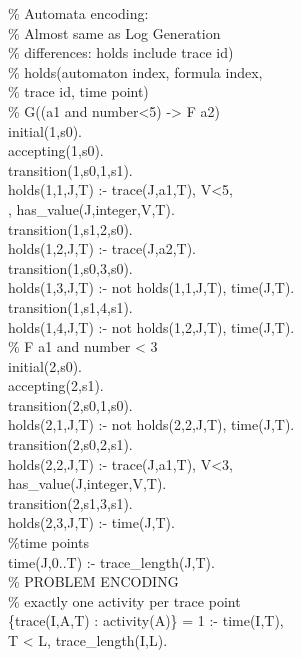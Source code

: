 \begin{small}
\begin{aspcode}
\noindent
\% Automata encoding:\\
\% Almost same as Log Generation\\
\% differences: holds include trace id)\\
\% holds(automaton index, formula index,\\ 
\% \phantom{holds(au} trace id, time point)\\

\noindent
\% G((a1 and number<5) -> F a2)\\
initial(1,s0).\\
accepting(1,s0).\\
transition(1,s0,1,s1).\\
holds(1,1,J,T) :- trace(J,a1,T), V<5,\\ 
\phantom{ho}, has\_value(J,integer,V,T).\\ 
transition(1,s1,2,s0).\\
holds(1,2,J,T) :- trace(J,a2,T).\\
transition(1,s0,3,s0).\\
holds(1,3,J,T) :- not holds(1,1,J,T), time(J,T).\\
transition(1,s1,4,s1).\\
holds(1,4,J,T) :- not holds(1,2,J,T), time(J,T).\\

\noindent 
\% F a1 and number < 3\\
initial(2,s0).\\
accepting(2,s1).\\
transition(2,s0,1,s0).\\
holds(2,1,J,T) :- not holds(2,2,J,T), time(J,T).\\ 
transition(2,s0,2,s1).\\
holds(2,2,J,T) :- trace(J,a1,T), V<3,\\ 
\phantom{ho}has\_value(J,integer,V,T).\\
transition(2,s1,3,s1).\\
holds(2,3,J,T) :- time(J,T).\\

\noindent
\%time points\\
time(J,0..T) :- trace\_length(J,T).\\

\noindent
\% PROBLEM ENCODING\\

\noindent
\% exactly one activity per trace point\\
\{trace(I,A,T) : activity(A)\} = 1 :- time(I,T),\\
T < L, trace\_length(I,L).\\


\end{aspcode}
\end{small}
